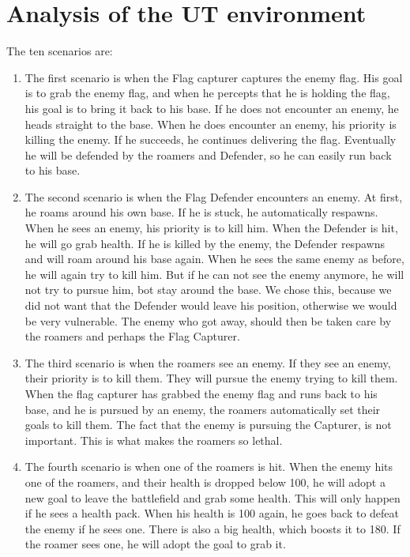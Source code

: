 \chapter{Analysis of the UT environment}
The ten scenarios are:
\begin{enumerate}
	\item The first scenario is when the Flag capturer captures the enemy flag. His goal is to grab the enemy flag, and when he percepts that he is holding the flag, his goal is to bring it back to his base. If he does not encounter an enemy, he heads straight to the base. When he does encounter an enemy, his priority is killing the enemy. If he succeeds, he continues delivering the flag. Eventually he will be defended by the roamers and Defender, so he can easily run back to his base.\\
	\item The second scenario is when the Flag Defender encounters an enemy. At first, he roams around his own base. If he is stuck, he automatically respawns. When he sees an enemy, his priority is to kill him. When the Defender is hit, he will go grab health. If he is killed by the enemy, the Defender respawns and will roam around his base again. When he sees the same enemy as before, he will again try to kill him. But if he can not see the enemy anymore, he will not try to pursue him, bot stay around the base. We chose this, because we did not want that the Defender would leave his position, otherwise we would be very vulnerable. The enemy who got away, should then be taken care by the roamers and perhaps the Flag Capturer.\\
	\item The third scenario is when the roamers see an enemy. If they see an enemy, their priority is to kill them. They will pursue the enemy trying to kill them. When the flag capturer has grabbed the enemy flag and runs back to his base, and he is pursued by an enemy, the roamers automatically set their goals to kill them. The fact that the enemy is pursuing the Capturer, is not important. This is what makes the roamers so lethal. \\
	\item The fourth scenario is when one of the roamers is hit. When the enemy hits one of the roamers, and their health is dropped below 100, he will adopt a new goal to leave the battlefield and grab some health. This will only happen if he sees a health pack. When his health is 100 again, he goes back to defeat the enemy if he sees one. There is also a big health, which boosts it to 180. If the roamer sees one, he will adopt the goal to grab it.\\

\end{enumerate}
